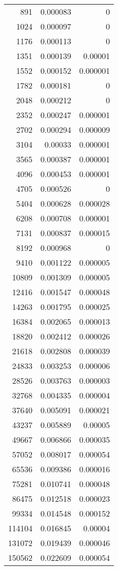 \begin{longtable}{r r r}
891 & 0.000083 & 0 \\
1024 & 0.000097 & 0 \\
1176 & 0.000113 & 0 \\
1351 & 0.000139 & 0.00001 \\
1552 & 0.000152 & 0.000001 \\
1782 & 0.000181 & 0 \\
2048 & 0.000212 & 0 \\
2352 & 0.000247 & 0.000001 \\
2702 & 0.000294 & 0.000009 \\
3104 & 0.00033 & 0.000001 \\
3565 & 0.000387 & 0.000001 \\
4096 & 0.000453 & 0.000001 \\
4705 & 0.000526 & 0 \\
5404 & 0.000628 & 0.000028 \\
6208 & 0.000708 & 0.000001 \\
7131 & 0.000837 & 0.000015 \\
8192 & 0.000968 & 0 \\
9410 & 0.001122 & 0.000005 \\
10809 & 0.001309 & 0.000005 \\
12416 & 0.001547 & 0.000048 \\
14263 & 0.001795 & 0.000025 \\
16384 & 0.002065 & 0.000013 \\
18820 & 0.002412 & 0.000026 \\
21618 & 0.002808 & 0.000039 \\
24833 & 0.003253 & 0.000006 \\
28526 & 0.003763 & 0.000003 \\
32768 & 0.004335 & 0.000004 \\
37640 & 0.005091 & 0.000021 \\
43237 & 0.005889 & 0.00005 \\
49667 & 0.006866 & 0.000035 \\
57052 & 0.008017 & 0.000054 \\
65536 & 0.009386 & 0.000016 \\
75281 & 0.010741 & 0.000048 \\
86475 & 0.012518 & 0.000023 \\
99334 & 0.014548 & 0.000152 \\
114104 & 0.016845 & 0.00004 \\
131072 & 0.019439 & 0.000046 \\
150562 & 0.022609 & 0.000054 \\

\end{longtable}
